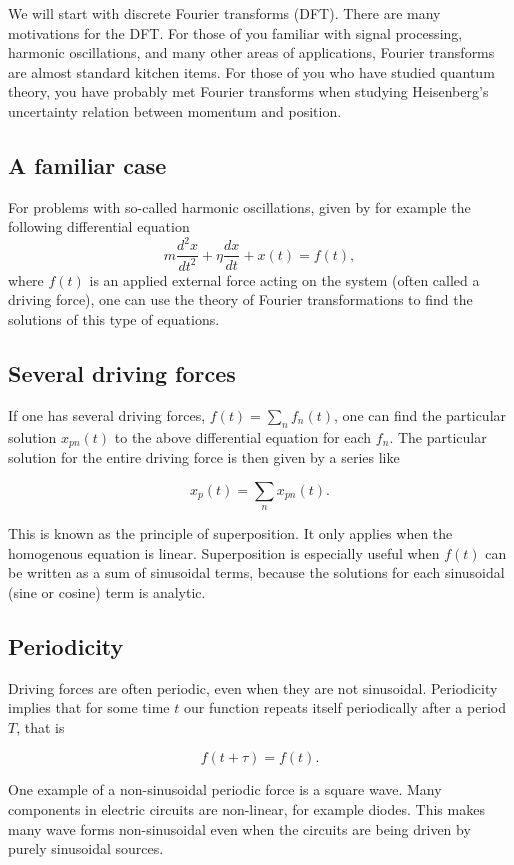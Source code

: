\documentclass[%
oneside,                 %
final,                   %
10pt]{article}
\begin{document}
We will start with discrete Fourier transforms (DFT).  There are many
motivations for the DFT. For those of you familiar with signal
processing, harmonic oscillations, and many other areas of
applications, Fourier transforms are almost standard kitchen
items. For those of you who have studied quantum theory, you have
probably met Fourier transforms when studying Heisenberg's uncertainty
relation between momentum and position.

\subsection{A familiar case}

For problems with so-called harmonic oscillations, given by for example the following differential equation
\[
m\frac{d^2x}{dt^2}+\eta\frac{dx}{dt}+x(t)=f(t),
\]
where $f(t)$ is an applied external force acting on the system (often
called a driving force), one can use the theory of Fourier
transformations to find the solutions of this type of equations.

\subsection{Several driving forces}

If one has several driving forces, $f(t)=\sum_n f_n(t)$, one can find
the particular solution $x_{pn}(t)$ to the above differential equation for each $f_n$. The particular
solution for the entire driving force is then given by a series like

\[
x_p(t)=\sum_nx_{pn}(t).
\]

This is known as the principle of superposition. It only applies when
the homogenous equation is linear. 
Superposition is especially useful when $f(t)$ can be written
as a sum of sinusoidal terms, because the solutions for each
sinusoidal (sine or cosine)  term is analytic. 

\subsection{Periodicity}

Driving forces are often periodic, even when they are not
sinusoidal. Periodicity implies that for some time $t$ our function repeats itself periodically after a period $T$, that is

\[
f(t+\tau)=f(t). 
\]

One example of a non-sinusoidal periodic force is a square wave. Many
components in electric circuits are non-linear, for example diodes. This 
makes many wave forms non-sinusoidal even when the circuits are being
driven by purely sinusoidal sources.
\end{document}
